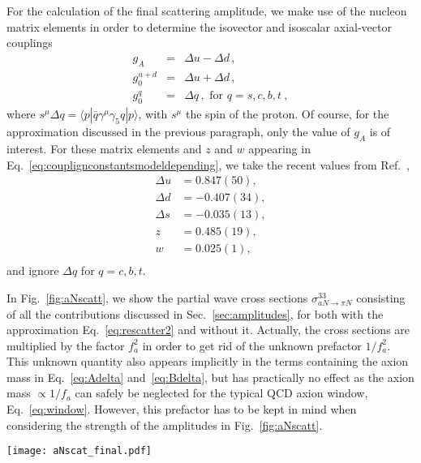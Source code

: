\documentclass[reprint,amssymb,amsmath,floatfix,aps,prd,groupedaddress,nofootinbib]{revtex4-2}
\begin{document}
For the calculation of the final scattering amplitude, we make use of the nucleon matrix elements in order
to determine the isovector and isoscalar axial-vector couplings
\begin{eqnarray}
g_A &=& \Delta u-\Delta d\,, \nonumber \\
g_0^{u+d} &=& \Delta u+\Delta d\,, \\
g_0^q &=& \Delta q\,,\text{ for } q=s,c,b,t\ , \nonumber
\end{eqnarray}
where $s^\mu\Delta q=\langle p | \bar{q}\gamma^\mu\gamma_5 q|p\rangle$, with $s^\mu$ the spin of the proton.
Of course, for the approximation discussed in the previous paragraph, only the value of $g_A$ is of
interest. For these matrix elements and $z$ and $w$ appearing in Eq.~\eqref{eq:couplignconstantsmodeldepending},
we take the recent values from Ref.~\cite{Aoki:2021kgd},
\begin{equation}
\begin{array}{rlrlrl}
\Delta u & = 0.847(50) , \\ \Delta d & = -0.407(34) , \\ \Delta s & = -0.035(13)  , \\
z & = 0.485(19) , \\ w & = 0.025(1)  , \\
\end{array}
\end{equation}
and ignore $\Delta q$ for $q=c,b,t$. 

In Fig.~\ref{fig:aNscatt}, we show the partial wave cross sections $\sigma^{33}_{aN\to\pi N}$ consisting of all
the contributions discussed in Sec.~\ref{sec:amplitudes}, for both with the approximation
Eq.~\eqref{eq:rescatter2} and without it. Actually, the cross sections are multiplied by the
factor $f_a^2$ in order to get rid of the unknown prefactor $1/f_a^2$. This unknown quantity
also appears implicitly in the terms containing the axion mass in Eq.~\eqref{eq:Adelta} and~\eqref{eq:Bdelta},
but has practically no effect as the axion mass $\propto 1/f_a$ can safely be neglected for the
typical QCD axion window, Eq.~\eqref{eq:window}. However, this prefactor has to be kept in mind when
considering the strength of the amplitudes in Fig.~\ref{fig:aNscatt}.
\begin{figure*}[t]
\centering
\texttt{[image: aNscat\_final.pdf]}
\caption{The $a N\to\pi N$ partial wave cross section of the $P_{33}$ channel versus the c.m. energy $W$ for
the DFSZ axion at different values of $\sin^2\beta$ and the KSVZ axion (which corresponds to $\sin^2\beta
= \frac{1}{2}$, see main text). The dashed curve corresponds to the approximated case based on
Eq.~\eqref{eq:rescatter2}.
}
\label{fig:aNscatt}
\end{figure*}
\end{document}
